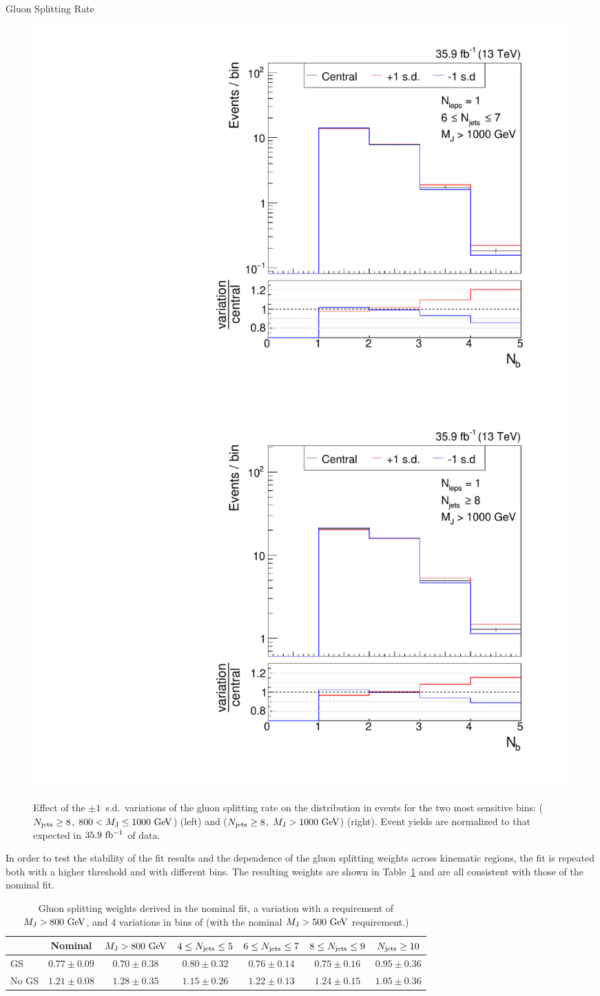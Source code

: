 \begin{section}{Gluon Splitting Rate}
\begin{figure}[tbp!]
\begin{center}
\includegraphics[angle=0,width=0.45\columnwidth]{fig/bin20_ttbar_gs_mconly.pdf}
\includegraphics[angle=0,width=0.45\columnwidth]{fig/bin21_ttbar_gs_mconly.pdf}
\end{center}
\caption{Effect of the $\pm 1$~s.d.\ variations of the gluon splitting rate on the \Nb distribution in \ttbar events for the two most sensitive bins: ($N_{\mathrm{jets}} \geq 8$, $800 < M_{\mathrm{J}} \leq 1000~\mathrm{Ge\kern -0.1em V}$) (left) and ($N_{\mathrm{jets}} \geq 8$, $M_{\mathrm{J}} > 1000~\mathrm{Ge\kern -0.1em V}$) (right).
Event yields are normalized to that expected in $35.9~\mathrm{fb^{-1}}$ of data.}
\label{fig:gs_variations}
\end{figure}

In order to test the stability of the fit results and the dependence of the gluon splitting weights across kinematic regions, the \dRbb fit is repeated both with a higher \MJ threshold and with different \Njets bins. 
The resulting weights are shown in Table~\ref{tab:gs_variations} and are all consistent with those of the nominal fit.

\begin{table}[tb!]
\setlength\tabcolsep{3pt}
\centering
\begin{tabular}{l|cccccc}
 & Nominal & $M_{\mathrm{J}} > 800~\mathrm{Ge\kern -0.1em V}$ & $4 \leq N_{\mathrm{jets}} \leq 5$ & $6 \leq N_{\mathrm{jets}} \leq 7$ & $8 \leq N_{\mathrm{jets}} \leq 9$ & $N_{\mathrm{jets}} \geq 10$ \\
\hline
GS    & $0.77 \pm 0.09$ & $0.70 \pm 0.38$ & $ 0.80 \pm 0.32$  & $ 0.76 \pm 0.14$ & $ 0.75 \pm 0.16$  & $ 0.95 \pm 0.36$ \\
No GS & $1.21 \pm 0.08$ & $1.28 \pm 0.35$ & $ 1.15 \pm 0.26$  & $ 1.22 \pm 0.13$ & $ 1.24 \pm 0.15$  & $ 1.05 \pm 0.36$ \\
\end{tabular}
\caption{Gluon splitting weights derived in the nominal fit, a variation with a requirement of $M_{\mathrm{J}} > 800~\mathrm{Ge\kern -0.1em V}$, and 4 variations in bins of \Njets (with the nominal $M_{\mathrm{J}} > 500~\mathrm{Ge\kern -0.1em V}$ requirement.)}
\label{tab:gs_variations}
\end{table}

\end{section}

